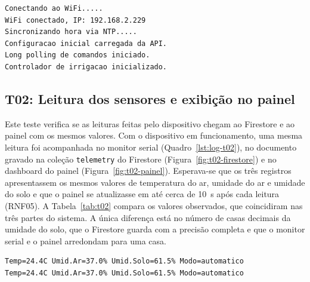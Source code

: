 \vspace{0.6\baselineskip}
\noindent\begin{minipage}{\linewidth}
\begin{lstlisting}[language={}, caption={Log do monitor serial na inicialização do dispositivo (T01)}, label={lst:log-t01}]
Conectando ao WiFi.....
WiFi conectado, IP: 192.168.2.229
Sincronizando hora via NTP.....
Configuracao inicial carregada da API.
Long polling de comandos iniciado.
Controlador de irrigacao inicializado.
\end{lstlisting}
\vspace{-0.5\baselineskip}
\end{minipage}
\medskip

\subsection{T02: Leitura dos sensores e exibição no painel}

Este teste verifica se as leituras feitas pelo dispositivo chegam ao Firestore e ao painel com os mesmos valores. Com o dispositivo em funcionamento, uma mesma leitura foi acompanhada no monitor serial (Quadro~\ref{lst:log-t02}), no documento gravado na coleção \texttt{telemetry} do Firestore (Figura~\ref{fig:t02-firestore}) e no dashboard do painel (Figura~\ref{fig:t02-painel}). Esperava-se que os três registros apresentassem os mesmos valores de temperatura do ar, umidade do ar e umidade do solo e que o painel se atualizasse em até cerca de 10~s após cada leitura (RNF05). A Tabela~\ref{tab:t02} compara os valores observados, que coincidiram nas três partes do sistema. A única diferença está no número de casas decimais da umidade do solo, que o Firestore guarda com a precisão completa e que o monitor serial e o painel arredondam para uma casa.

\vspace{0.6\baselineskip}
\noindent\begin{minipage}{\linewidth}
\begin{lstlisting}[language={}, caption={Log do monitor serial com as leituras dos sensores (T02)}, label={lst:log-t02}]
Temp=24.4C Umid.Ar=37.0% Umid.Solo=61.5% Modo=automatico
Temp=24.4C Umid.Ar=37.0% Umid.Solo=61.5% Modo=automatico
\end{lstlisting}
\vspace{-0.5\baselineskip}
\end{minipage}
\medskip

